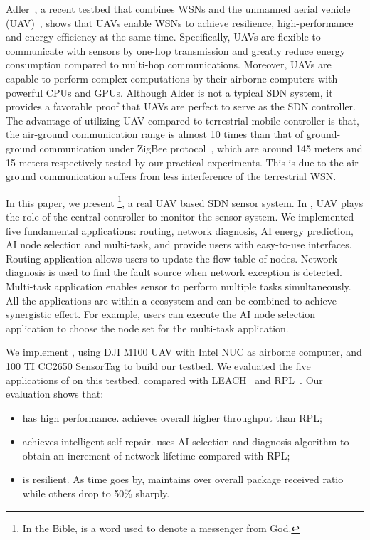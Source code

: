 Adler~\cite{Alder}, a recent testbed that combines WSNs
and the unmanned aerial vehicle (UAV)~\cite{Cambone2005Unmanned, Perry2000Unmanned, Cathcart2014Method},
shows that UAVs enable WSNs to achieve resilience, 
high-performance and energy-efficiency at the same time.
Specifically, UAVs are flexible to 
communicate with sensors by one-hop transmission
and greatly reduce energy consumption compared to multi-hop communications.
Moreover, UAVs are capable to perform complex computations 
by their airborne computers with powerful CPUs and GPUs.
Although Alder is not a typical SDN system, it provides a favorable proof
that UAVs are perfect to serve as the SDN controller.
The advantage of utilizing UAV compared to
terrestrial mobile controller is that, the air-ground communication range
is almost 10 times than that of ground-ground communication under ZigBee protocol~\cite{}, which are
around 145 meters and 15 meters respectively tested by our practical experiments.
This is due to the air-ground communication suffers from less interference of the terrestrial WSN.

In this paper, we present {\sdn}\footnote{In the Bible, {\sdn} is a word used to denote a messenger from God. }, 
a real UAV based SDN sensor system.
In {\sdn}, UAV plays the role of the central controller to monitor the sensor system.
We implemented five fundamental applications: routing, network diagnosis, 
AI energy prediction, AI node selection and multi-task,
and provide users with easy-to-use interfaces.
Routing application allows users to update the flow table of nodes.
Network diagnosis is used to find the fault source when network exception is detected.
Multi-task application enables sensor to perform multiple 
tasks simultaneously. All the applications are within a ecosystem
and can be combined to achieve synergistic effect. For example,
users can execute the AI node selection application to choose
the node set for the multi-task application. 


We implement {\sdn}, using DJI M100 UAV with Intel NUC as airborne computer, 
and 100 TI CC2650 SensorTag to build our testbed.
We evaluated the five applications of  {\sdn} on this testbed, 
compared with LEACH~\cite{} and RPL~\cite{}.
Our evaluation shows that:
\begin{itemize}
	\item[1)] {\sdn} has high performance. {\sdn} achieves overall {\simpleTput} higher
		throughput than RPL;
	\item[2)] {\sdn} achieves intelligent  self-repair. {\sdn} uses AI
		selection and diagnosis algorithm to obtain an {\totalLife} increment of network lifetime
		compared with RPL;
	\item[3)] {\sdn} is resilient. As time goes by, {\sdn} maintains over
		{\pktRecvRatio} overall package received ratio while others drop to 50\%
		sharply.
\end{itemize}

